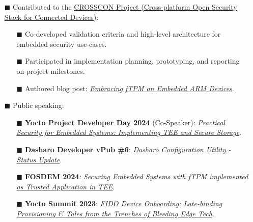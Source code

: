 \documentclass[9pt]{./src/packages/Developer_CV/developercv}
\begin{document}
\begin{entrylist}
{\begin{enumerate}
        \begin{enumerate}
            \item[$\blacksquare$] Worked on board support packages and device tree configurations for embedded targets.
            \item[$\blacksquare$] Developed test cases, CI/CD pipelines and documentation.
            \item[$\blacksquare$] Contributed patches and improvements to upstream open-source projects as part of integration efforts.
        \end{enumerate}
        \item[$\blacksquare$] Contributed to the \href{https://crosscon.eu/}{CROSSCON Project (Cross-platform Open Security Stack for Connected Devices)}:
        \begin{enumerate}
            \item[$\blacksquare$] Co-developed validation criteria and high-level architecture for embedded security use-cases.
            \item[$\blacksquare$] Participated in implementation planning, prototyping, and reporting on project milestones.
            \item[$\blacksquare$] Authored blog post: \href{https://crosscon.eu/blog/embracing-ftpm-embedded-arm-devices-insights-and-solutions}{\textit{Embracing fTPM on Embedded ARM Devices}}.
        \end{enumerate}
        \item[$\blacksquare$] Public speaking:
        \begin{enumerate}
            \item[$\blacksquare$] \textbf{Yocto Project Developer Day 2024} (Co-Speaker): {\href{https://www.youtube.com/watch?v=W78AKeWh57g}{\textit{Practical Security for Embedded Systems: Implementing TEE and Secure Storage}}}.
            \item[$\blacksquare$] \textbf{Dasharo Developer vPub \#6}: {\href{https://www.youtube.com/watch?v=9vBZeIZnS3o}{\textit{Dasharo Configuration Utility - Status Update}}}.
            \item[$\blacksquare$] \textbf{FOSDEM 2024}: {\href{https://archive.fosdem.org/2024/schedule/event/fosdem-2024-3097-securing-embedded-systems-with-ftpm-implemented-as-trusted-application-in-tee/}{\textit{Securing Embedded Systems with fTPM implemented as Trusted Application in TEE}}}.
            \item[$\blacksquare$] \textbf{Yocto Summit 2023}: {\href{https://www.youtube.com/watch?v=Wg1ZUdwTYNM&t=1s}{\textit{FIDO Device Onboarding: Late-binding Provisioning \& Tales from the Trenches of Bleeding Edge Tech}}}.

\end{enumerate}
\end{enumerate}}
\end{entrylist}
\end{document}
